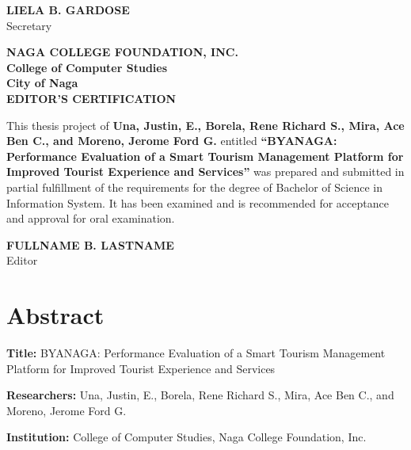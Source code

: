 \documentclass{research}
\begin{document}
\begin{center}
  \textbf{LIELA B. GARDOSE}\\
  Secretary
\end{center}

\vfill
\clearpage

\thispagestyle{empty}
\begin{center}
  {\bfseries NAGA COLLEGE FOUNDATION, INC.}\\[0.5em]
  {\bfseries College of Computer Studies}\\[0.5em]
  {\bfseries City of Naga}\\[2em]
  {\bfseries EDITOR'S CERTIFICATION}
\end{center}

\vspace{1.5em}

\noindent
This thesis project of \textbf{Una, Justin, E., Borela, Rene Richard S., Mira, Ace Ben C., and Moreno, Jerome Ford G.} entitled \textbf{``BYANAGA: Performance Evaluation of a Smart Tourism Management Platform for Improved Tourist Experience and Services''} was prepared and submitted in partial fulfillment of the requirements for the degree of Bachelor of Science in Information System. It has been examined and is recommended for acceptance and approval for oral examination.

\vspace{5em}

\begin{center}
  \textbf{FULLNAME B. LASTNAME}\\
  Editor
\end{center}

\vfill
\clearpage

\pagestyle{fancy}
\chapter*{Abstract}
\noindent\textbf{Title:} BYANAGA: Performance Evaluation of a Smart Tourism Management Platform for Improved Tourist Experience and Services

\noindent\textbf{Researchers:} Una, Justin, E., Borela, Rene Richard S., Mira, Ace Ben C., and Moreno, Jerome Ford G.

\noindent\textbf{Institution:} College of Computer Studies, Naga College Foundation, Inc.
\end{document}

